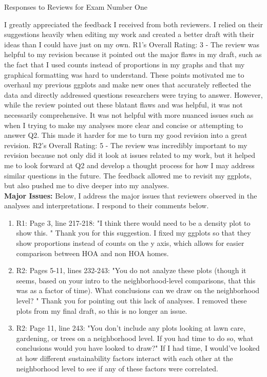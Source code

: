 \documentclass{article}
\begin{document}

\begin{center}
  {\LARGE Responses to Reviews for Exam Number One}\\\vspace{1em}
\end{center}

I greatly appreciated the feedback I received from both reviewers. I relied on their suggestions heavily when editing my work and created a better draft with their ideas than I could have just on my own. 
\newline
\newline
R1's Overall Rating: 3 - The review was helpful to my revision because it pointed out the major flaws in my draft, such as the fact that I used counts instead of proportions in my graphs and that my graphical formatting was hard to understand. These points motivated me to overhaul my previous ggplots and make new ones that accurately reflected the data and directly addressed questions researchers were trying to answer. However, while the review pointed out these blatant flaws and was helpful, it was not necessarily comprehensive. It was not helpful with more nuanced issues such as when I trying to make my analyses more clear and concise or attempting to answer Q2. This made it harder for me to turn my good revision into a great revision.   
\newline
\newline
R2's Overall Rating: 5 - The review was incredibly important to my revision because not only did it look at issues related to my work, but it helped me to look forward at Q2 and develop a thought process for how I may address similar questions in the future. The feedback allowed me to revisit my ggplots, but also pushed me to dive deeper into my analyses.\\

\textbf{Major Issues:} Below, I address the major issues that reviewers observed in the analyses and interpretations. I respond to their comments below. 
\begin{enumerate}
  \item R1: Page 3, line 217-218: "I think there would need to be a density plot to show this. " Thank you for this suggestion. I fixed my ggplots so that they show proportions instead of counts on the y axis, which allows for easier comparison between HOA and non HOA homes.
  \item R2: Pages 5-11, lines 232-243: "You do not analyze these plots (though it seems, based on your intro to the neighborhood-level comparisons, that this was as a factor of time). What conclusions can we draw on the neighborhood level? " Thank you for pointing out this lack of analyses. I removed these plots from my final draft, so this is no longer an issue.
  \item R2: Page 11, line 243: "You don’t include any plots looking at lawn care, gardening, or trees on a neighborhood level. If you had time to do so, what conclusions would you have looked to draw?" If I had time, I would've looked at how different sustainability factors interact with each other at the neighborhood level to see if any of these factors were correlated.  
\end{enumerate}
\end{document}
